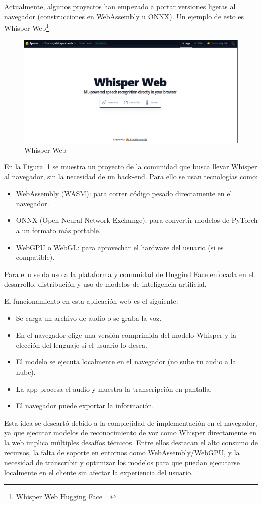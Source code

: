 \documentclass[a4paper, 12pt]{book}
\begin{document}
Actualmente, algunos proyectos han empezado a portar versiones ligeras al navegador (construcciones en WebAssembly u ONNX). Un ejemplo de esto es Whisper Web\footnote{Whisper Web Hugging Face ~\cite{whisperweb}.}

\begin{figure}[H]
    \centering
    \includegraphics[width=0.8\linewidth]{img/WhisperWeb.png}
    \caption{Whisper Web}
    \label{fig:WhisperWeb}
\end{figure}

En la Figura~\ref{fig:WhisperWeb} se muestra un proyecto de la comunidad que busca llevar Whisper al navegador, sin la necesidad de un back-end. Para ello se usan tecnologías como:
\begin{itemize}
  \item WebAssembly (WASM): para correr código pesado directamente en el navegador.
  \item ONNX (Open Neural Network Exchange): para convertir modelos de PyTorch a un formato más portable.
  \item WebGPU o WebGL: para aprovechar el hardware del usuario (si es compatible).
\end{itemize}

Para ello se da uso a la plataforma y comunidad de Huggind Face enfocada en el desarrollo, distribución y uso de modelos de inteligencia artificial. 

El funcionamiento en esta aplicación web es el siguiente: 
\begin{itemize}
  \item Se carga un archivo de audio o se graba la voz.
  \item En el navegador elige una versión comprimida del modelo Whisper y la elección del lenguaje si el usuario lo desea.
  \item El modelo se ejecuta localmente en el navegador (no sube tu audio a la nube).
  \item La app procesa el audio y muestra la transcripción en pantalla.
  \item El navegador puede exportar la información.
\end{itemize}
Esta idea se descartó debido a la complejidad de implementación en el navegador, ya que ejecutar modelos de reconocimiento de voz como Whisper directamente en la web implica múltiples desafíos técnicos. Entre ellos destacan el alto consumo de recursos, la falta de soporte en entornos como WebAssembly/WebGPU, y la necesidad de transcribir y optimizar los modelos para que puedan ejecutarse localmente en el cliente sin afectar la experiencia del usuario.
\end{document}

